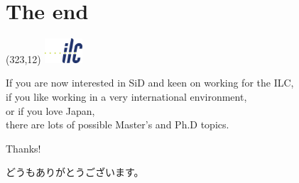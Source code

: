\documentclass[xcolor={dvipsnames}]{beamer}
\newcommand{\ilclogo}{
  \setlength{\TPHorizModule}{1pt}
  \setlength{\TPVertModule}{1pt}
  \begin{textblock}{1}(323,12)
   \includegraphics[width=40pt,height=26pt]{figures/ILC.jpeg}
  \end{textblock}
}
\begin{document}
\section*{The end}
{
\begin{frame}
\ilclogo
\begin{center}
 If you are now interested in SiD and keen on working for the ILC, \\
if you like working in a very international environment, \\
or if you love Japan,\\
there are lots of possible Master's and Ph.D topics.\\
\vspace*{1cm}
\textcolor{RubineRed}{
	\LARGE Thanks!\\
	\begin{CJK}{UTF8}{min}
	どうもありがとうございます。
	\end{CJK}
}
\end{center}
\end{frame}
}
\end{document}
